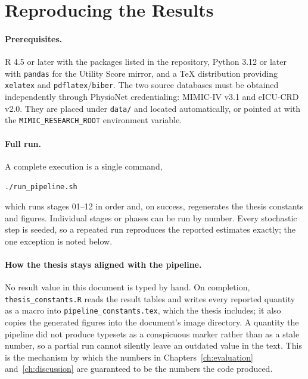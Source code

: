 \section{Reproducing the Results}
\label{app:repro}

\paragraph{Prerequisites.} R 4.5 or later with the packages listed in the
repository, Python 3.12 or later with \texttt{pandas} for the Utility Score
mirror, and a \TeX{} distribution providing \texttt{xelatex} and
\texttt{pdflatex}/\texttt{biber}. The two source databases must be obtained
independently through PhysioNet credentialing: MIMIC-IV v3.1 and eICU-CRD
v2.0. They are placed under \texttt{data/} and located automatically, or
pointed at with the \texttt{MIMIC\_RESEARCH\_ROOT} environment variable.

\paragraph{Full run.} A complete execution is a single command,

\begin{center}\texttt{./run\_pipeline.sh}\end{center}

\noindent
which runs stages 01--12 in order and, on success, regenerates the thesis
constants and figures. Individual stages or phases can be run by number. Every
stochastic step is seeded, so a repeated run reproduces the reported estimates
exactly; the one exception is noted below.

\paragraph{How the thesis stays aligned with the pipeline.} No result value in
this document is typed by hand. On completion, \texttt{thesis\_constants.R}
reads the result tables and writes every reported quantity as a macro into
\texttt{pipeline\_constants.tex}, which the thesis includes; it also copies the
generated figures into the document's image directory. A quantity the pipeline
did not produce typesets as a conspicuous marker rather than as a stale number,
so a partial run cannot silently leave an outdated value in the text. This is
the mechanism by which the numbers in Chapters~\ref{ch:evaluation}
and~\ref{ch:discussion} are guaranteed to be the numbers the code produced.

